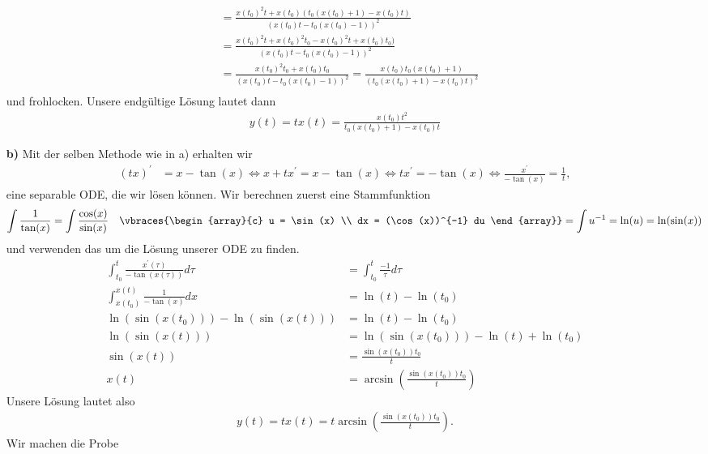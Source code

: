 \begin{solution}
\begin{itemize}
\begin{align*}
    &= \frac{x(t_0)^2t + x(t_0)(t_0(x(t_0) + 1) - x(t_0)t)}{(x(t_0)t - t_0(x(t_0) - 1))^2}\\
    &= \frac{x(t_0)^2t + x(t_0)^2t_0 - x(t_0)^2t + x(t_0)t_0)}{(x(t_0)t - t_0(x(t_0) - 1))^2}\\
    &= \frac{x(t_0)^2t_0 + x(t_0)t_0}{(x(t_0)t - t_0(x(t_0) - 1))^2}
    = \frac{x(t_0)t_0(x(t_0) + 1)}{(t_0(x(t_0) + 1) - x(t_0)t)^2}\\
  \end{align*}
  und frohlocken.
  Unsere endgültige Lösung lautet dann
  \begin{align*}
    y(t) = tx(t) = \frac{x(t_0)t^2}{t_0(x(t_0) + 1) - x(t_0)t}
  \end{align*}
  \item [\textbf{b)}]
  Mit der selben Methode wie in a) erhalten wir
  \begin{align*}
    (tx)^{\prime} &= x - \tan(x) \iff x + tx^\prime = x - \tan(x) \iff tx^\prime = -\tan(x) \iff \frac{x^{\prime}}{-\tan(x)} = \frac{1}{t}, 
  \end{align*}
  eine separable ODE, die wir lösen können. 
  Wir berechnen zuerst eine Stammfunktion 
  \begin{align*}
    \int \frac{1}{\tan(x)} = \int \frac{\cos(x)}{\sin(x)} \quad \vbraces{\begin{array}{c} u = \sin(x) \\ dx = (\cos(x))^{-1} du \end{array}} = \int u^{-1} = \ln(u) = \ln(\sin(x))
  \end{align*}
  und verwenden das um die Lösung unserer ODE zu finden.
  \begin{align*}
    \int_{t_0}^t \frac{x^{\prime}(\tau)}{-\tan(x(\tau))}d\tau &= \int_{t_0}^t \frac{-1}{\tau}d\tau \\
    \int_{x(t_0)}^{x(t)} \frac{1}{-\tan(x)}dx &= \ln(t) - \ln(t_0) \\
    \ln(\sin(x(t_0))) - \ln(\sin(x(t))) &= \ln(t) - \ln(t_0) \\
    \ln(\sin(x(t))) &= \ln(\sin(x(t_0))) - \ln(t) + \ln(t_0) \\
    \sin(x(t)) &= \frac{\sin(x(t_0))t_0}{t} \\
    x(t) &= \arcsin\left(\frac{\sin(x(t_0))t_0}{t}\right)
  \end{align*}
  Unsere Lösung lautet also
  \begin{align*}
    y(t) = tx(t) = t\arcsin\left(\frac{\sin(x(t_0))t_0}{t}\right).
  \end{align*}
  Wir machen die Probe
  \begin{align*}

\end{align*}
\end{itemize}
\end{solution}
